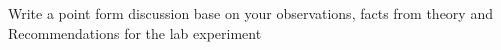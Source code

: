 Write a point form discussion base on your observations, facts from theory and Recommendations for the lab experiment
